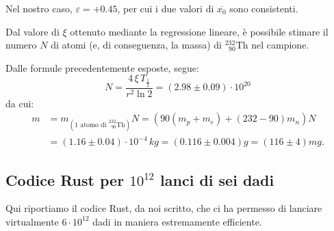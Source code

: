 \documentclass{article}
\newcommand*{\Th}{^{232}_{\;\;90} \text{Th}}
\begin{document}
Nel nostro caso, $\varepsilon = +0.45$, per cui i due valori di $\overline{x_0}$
sono consistenti.

Dal valore di $\xi$ ottenuto mediante la regressione lineare, è possibile stimare
il numero $N$ di atomi (e, di conseguenza, la massa) di $\Th$ nel campione.

Dalle formule precedentemente esposte, segue:
\[
    N = \frac{4\,\xi\,T_\frac{1}{2}}{r^2\ln{2}}
    = \left(2.98\pm0.09\right)\cdot10^{20}
\]
da cui:
\[\begin{aligned}
    m &= m_{\left(\text{1 atomo di }\Th\right)}N
       = (90(m_p+m_e) + (232-90)m_n)N\\
      &= \left(1.16\pm0.04\right)\cdot10^{-4}\,\unit{kg}
       = \left(0.116\pm0.004\right)\unit{g}
       = \left(116\pm4\right)\unit{mg}.
\end{aligned}\]

\pagebreak
\begin{appendices}
    \section{Codice Rust per $10^{12}$ lanci di sei dadi}
    Qui riportiamo il codice Rust, da noi scritto, che ci ha permesso di
    lanciare virtualmente $6\cdot10^{12}$ dadi in maniera estremamente
    efficiente.

    \inputminted[linenos, mathescape]{rust}{src/main.rs}
\end{appendices}
\end{document}
